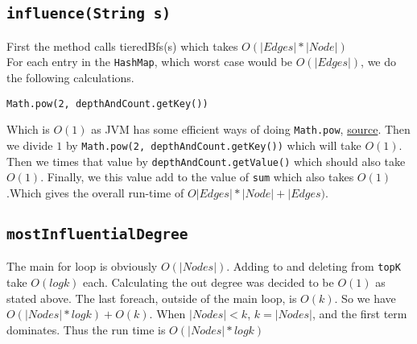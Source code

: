 \documentclass[10pt,letterpaper]{article}
\begin{document}
\subsection{\texttt{influence(String s)}}
First the method calls tieredBfs(s) which takes $O(|Edges| * |Node|)$\\
For each entry in the \texttt{HashMap}, which worst case would be $O(|Edges|)$, we do the following calculations.

\begin{verbatim}
Math.pow(2, depthAndCount.getKey()) 
\end{verbatim}
Which is $O(1)$ as JVM has some efficient ways of doing \texttt{Math.pow}, \href{https://stackoverflow.com/a/32419139/749721}{source}.
Then we divide $1$ by \texttt{Math.pow(2, depthAndCount.getKey())} which will
take $O(1)$. Then we times that value by \texttt{depthAndCount.getValue()} which should also take $O(1)$. Finally, we this value add to the value of \texttt{sum} which also takes $O(1)$.Which gives the overall run-time of $O|Edges| * |Node| + |Edges)$.\subsection{\texttt{mostInfluentialDegree}}
The main for loop is obviously $O(|Nodes|)$. Adding to and deleting from \texttt{topK} take $O(log k)$ each. Calculating the out degree was decided to be $O(1)$ as stated above. The last foreach, outside of the main loop, is $O(k)$. So we have $O(|Nodes|*log k)+O(k)$. When $|Nodes|<k$, $k=|Nodes|$, and the first term dominates. Thus the run time is $O(|Nodes|*log k)$
\end{document}
